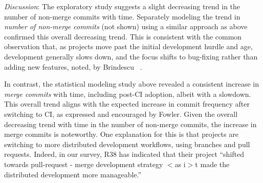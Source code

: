%

%

\smallskip\noindent \emph{Discussion}:
The exploratory study suggests a slight decreasing trend in the number 
of non-merge commits with time.
Separately modeling the trend in \emph{number of non-merge commits}
(not shown) using a similar approach as above confirmed this overall 
decreasing trend.
This is consistent with the common observation that, as projects move 
past the initial development hurdle and age, development generally slows 
down, and the focus shifts to bug-fixing rather than adding new features, 
noted, \eg by Brindescu \etal~\cite{brindescu2014centralized}.

In contrast, the statistical modeling study above revealed a consistent 
increase in \emph{merge commits} with time, including post-CI adoption, 
albeit with a slowdown.
This overall trend aligns with the expected increase in commit frequency 
after switching to CI, as expressed and encouraged by Fowler.
Given the overall decreasing trend with time in the number of non-merge
commits, the increase in merge commits is noteworthy.
One explanation for this is that projects are switching to more distributed
development workflows, using branches and pull requests. 
Indeed, in our survey, R38 has indicated that their project ``shifted towards 
pull-request - merge development strategy $<$as i$>$t made the distributed 
development more manageable.''

